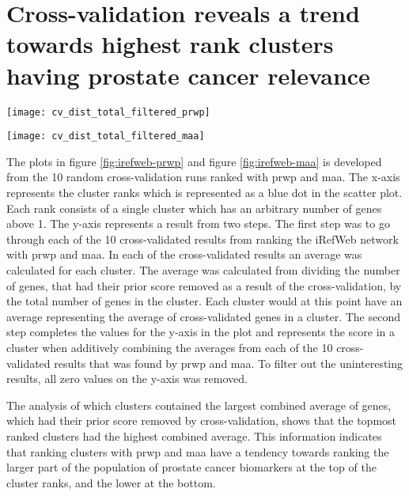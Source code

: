 \section{Cross-validation reveals a trend towards highest rank clusters having
prostate cancer relevance}
\begin{sidewaysfigure}
    \texttt{[image: cv\_dist\_total\_filtered\_prwp]}
    \caption{Distribution of combined averages of genes, which had their scores
    \label{fig:irefweb-prwp}
    removed by cross-validation, ranked by PRWP}
\end{sidewaysfigure}

\begin{sidewaysfigure}
    \texttt{[image: cv\_dist\_total\_filtered\_maa]}
    \caption{Distribution of combined averages of genes, which had their scores
    \label{fig:irefweb-maa}
    removed by cross-validation, ranked by MAA}
\end{sidewaysfigure}

The plots in figure \ref{fig:irefweb-prwp} and figure \ref{fig:irefweb-maa} is
developed from the 10 random cross-validation runs ranked with \gls{prwp} and
\gls{maa}. The x-axis represents the cluster ranks which is represented as
a blue dot in the scatter plot. Each rank consists of a single cluster which has
an arbitrary number of genes above 1. The y-axis represents a result from two
steps. The first step was to go through each of the
10 cross-validated results from ranking the iRefWeb network with \gls{prwp} and
\gls{maa}. In each of the cross-validated results an average was calculated for
each cluster. The average was calculated from dividing the number of genes, that
had their prior score removed as a result of the cross-validation, by the total
number of genes in the cluster. Each cluster would at this point have an average
representing the average of cross-validated genes in a cluster. The second step
completes the values for the y-axis in the plot and represents the score in
a cluster when additively combining the averages from each of the 10
cross-validated results that was found by \gls{prwp} and \gls{maa}. To filter
out the uninteresting results, all zero values on the y-axis was removed.

The analysis of which clusters contained the largest combined average of genes,
which had their prior score removed by cross-validation, shows that the topmost
ranked clusters had the highest combined average. This information indicates
that ranking clusters with \gls{prwp} and \gls{maa} have a tendency towards
ranking the larger part of the population of prostate cancer biomarkers at the
top of the cluster ranks, and the lower at the bottom.


